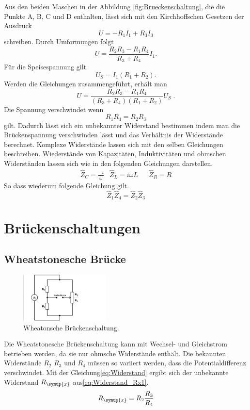 Aus den beiden Maschen in der Abbildung \ref{fig:Brueckenschaltung}, die die Punkte
A, B, C und D enthalten, lässt sich mit den Kirchhoffschen Gesetzen
der Ausdruck
\begin{equation}
  U=-R_1 I_1 + R_3 I_3
\end{equation}
schreiben.  Durch Umformungen folgt
\begin{equation}
  U =\frac{R_2 R_3-R_1 R_4}{R_3 + R_4}I_1   .
\end{equation}
Für die Speisespannung gilt
\begin{equation}
  U_S=I_1(R_1+R_2).
\end{equation}
Werden die Gleichungen zusammengeführt, erhält man
\begin{equation*}
  U=\frac{R_2 R_3-R_1 R_4}{(R_3+R_4)(R_1+R_2)}U_S\;.
\end{equation*}
Die Spannung verschwindet wenn
\begin{equation}
  R_1 R_4=R_2 R_3
  \label{eq:Widerstand}
\end{equation}
gilt. Dadurch lässt sich ein unbekannter Widerstand bestimmen indem man die
Brückenspannung verschwinden lässt und das Verhältnis der Widerstände berechnet.
Komplexe Widerstände lassen sich mit den selben Gleichungen beschreiben.
Wiederstände von Kapazitäten, Induktivitäten und ohmschen Widerständen lassen sich
wie in den folgenden Gleichungen darstellen.
\begin{align}
&\hat{Z}_C = \frac{-i}{\omega}  &  \hat{Z}_L=i\omega L & & \hat{Z}_R = R &
\end{align}
So dass wiederum folgende Gleichung gilt.
\begin{equation}
\hat{Z}_1\hat{Z}_4=\hat{Z}_2\hat{Z}_3
\end{equation}
\section{Brückenschaltungen}
\subsection{Wheatstonesche Brücke}
\begin{figure}
  \centering
  \includegraphics[width=0.4\textwidth]{Bilder/Wheatonsche.png}
  \caption{Wheatonsche Brückenschaltung\cite{sample}.}
  \label{fig:wheatonsche}
\end{figure}
Die Wheatstonesche Brückenschaltung kann mit Wechsel- und Gleichstrom betrieben werden,
da sie nur ohmsche Widerstände enthält. Die bekannten Widerstände $R_2$ $R_3$ und $R_4$
 müssen so variiert werden, dass die Potentialdifferenz verschwindet. Mit der
Gleichung\eqref{eq:Widerstand} ergibt sich der unbekannte Widerstand $R_\symup{x}$
aus\eqref{eq:Widerstand_Rx1}.
\begin{equation}
R_\symup{x}=R_2 \frac{R_3}{R_4}
\label{eq:Widerstand_Rx1}
\end{equation}
